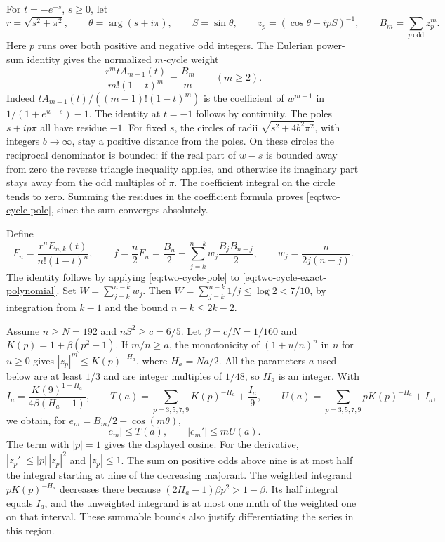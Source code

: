 For $t=-e^{-s}$, $s\ge0$, let
\[
 r=\sqrt{s^2+\pi^2},\qquad
 \theta=\arg(s+i\pi),\qquad S=\sin\theta,\qquad
 z_p=(\cos\theta+ipS)^{-1},\qquad
 B_m=\sum_{p\ \mathrm{odd}}z_p^m .
\]
Here $p$ runs over both positive and negative odd integers.
The Eulerian power-sum identity gives the normalized $m$-cycle weight
\begin{equation}
 \frac{r^m tA_{m-1}(t)}{m!(1-t)^m}=\frac{B_m}{m}\qquad(m\ge2).
 \label{eq:two-cycle-pole}
\end{equation}
Indeed $tA_{m-1}(t)/((m-1)!(1-t)^m)$ is the coefficient of $w^{m-1}$
in $1/(1+e^{w-s})-1$. The identity at $t=-1$ follows by continuity.
The poles $s+ip\pi$ all have residue $-1$.
For fixed $s$, the circles of radii $\sqrt{s^2+4b^2\pi^2}$, with integers
$b\to\infty$, stay a positive distance from the poles. On these
circles the reciprocal denominator is bounded: if the real part
of $w-s$ is bounded away from zero the reverse triangle inequality
applies, and otherwise its imaginary part stays away from the odd
multiples of $\pi$. The coefficient integral on the circle tends to
zero. Summing the residues in the coefficient formula proves
\eqref{eq:two-cycle-pole}, since the sum converges absolutely.

Define
\[
 F_n=\frac{r^n E_{n,k}(t)}{n!(1-t)^n},\qquad
 f=\frac n2F_n
   =\frac{B_n}{2}+\sum_{j=k}^{n-k}w_j\frac{B_jB_{n-j}}{2},
 \qquad w_j=\frac{n}{2j(n-j)}.
\]
The identity follows by applying \eqref{eq:two-cycle-pole} to
\eqref{eq:two-cycle-exact-polynomial}. Set $W=\sum_{j=k}^{n-k}w_j$.
Then $W=\sum_{j=k}^{n-k}1/j\le\log 2<7/10$, by integration from
$k-1$ and the bound $n-k\le2k-2$.

Assume $n\ge N=192$ and $nS^2\ge c=6/5$.
Let $\beta=c/N=1/160$ and $K(p)=1+\beta(p^2-1)$. If $m/n\ge a$,
the monotonicity of $(1+u/n)^n$ in $n$ for $u\ge0$ gives
$|z_p|^m\le K(p)^{-H_a}$, where $H_a=Na/2$.
All the parameters $a$ used below are at least $1/3$ and are integer
multiples of $1/48$, so $H_a$ is an integer. With
\[
 I_a=\frac{K(9)^{1-H_a}}{4\beta(H_a-1)},\qquad
 T(a)=\sum_{p=3,5,7,9} K(p)^{-H_a}+\frac{I_a}{9},\qquad
 U(a)=\sum_{p=3,5,7,9}pK(p)^{-H_a}+I_a ,
\]
we obtain, for $e_m=B_m/2-\cos(m\theta)$,
\begin{equation}
 |e_m|\le T(a),\qquad |e_m'|\le mU(a).
 \label{eq:two-cycle-single-tails}
\end{equation}
The term with $|p|=1$ gives the displayed cosine. For the derivative,
$|z_p'|\le |p|\,|z_p|^2$ and $|z_p|\le1$. The sum on positive odds
above nine is at most half the integral starting at nine of the
decreasing majorant. The weighted integrand $pK(p)^{-H_a}$ decreases
there because $(2H_a-1)\beta p^2>1-\beta$. Its half integral equals
$I_a$, and the unweighted integrand is at most one ninth of the weighted
one on that interval. These summable bounds also justify
differentiating the series in this region.

